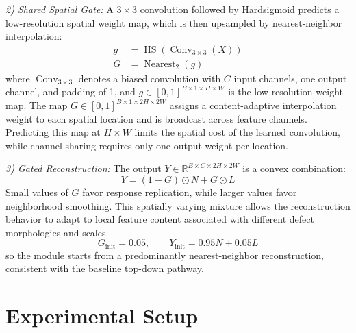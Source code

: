 \documentclass[journal]{IEEEtranTIE}
\begin{document}
\emph{2) Shared Spatial Gate:}
A $3\times3$ convolution followed by Hardsigmoid predicts a low-resolution spatial weight map, which is then upsampled by nearest-neighbor interpolation:
\begin{align}
g &= \operatorname{HS}(\operatorname{Conv}_{3\times3}(X)) \label{eq:giu-gate-lowres}\\
G &= \operatorname{Nearest}_{2}(g) \label{eq:giu-gate}
\end{align}
\noindent where $\operatorname{Conv}_{3\times3}$ denotes a biased convolution with $C$ input channels, one output channel, and padding of 1, and $g\in[0,1]^{B\times1\times H\times W}$ is the low-resolution weight map. The map $G\in[0,1]^{B\times1\times2H\times2W}$ assigns a content-adaptive interpolation weight to each spatial location and is broadcast across feature channels. Predicting this map at $H\times W$ limits the spatial cost of the learned convolution, while channel sharing requires only one output weight per location.

\emph{3) Gated Reconstruction:}
The output $Y\in\mathbb{R}^{B\times C\times2H\times2W}$ is a convex combination:
\begin{equation}
Y=(1-G)\odot N+G\odot L
\label{eq:giu-mixture}
\end{equation}
\noindent Small values of $G$ favor response replication, while larger values favor neighborhood smoothing. This spatially varying mixture allows the reconstruction behavior to adapt to local feature content associated with different defect morphologies and scales.
\begin{equation}
G_{\mathrm{init}}=0.05,\qquad Y_{\mathrm{init}}=0.95N+0.05L
\label{eq:giu-initialization}
\end{equation}
\noindent so the module starts from a predominantly nearest-neighbor reconstruction, consistent with the baseline top-down pathway.

\section{Experimental Setup}
\label{sec:experimental-setup}
\end{document}
